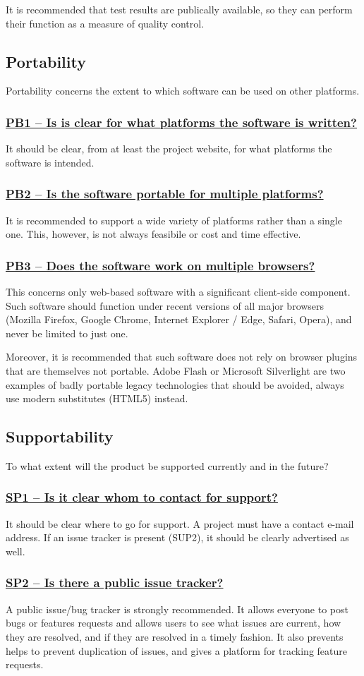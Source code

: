 \documentclass[a4paper,11pt]{article}
\newcommand{\criterion}[1]{\subsubsection*{\underline{#1}}}
\begin{document}
It is recommended that test results are publically available, so they can
perform their function as a measure of quality control.


\subsection{Portability}

Portability concerns the extent to which software can be used on other
platforms. 

\criterion{PB1 -- Is is clear for what platforms the software is written?}

It should be clear, from at least the project website, for what platforms the software
is intended.

\criterion{PB2 -- Is the software portable for multiple platforms?}

It is recommended to support a wide variety of platforms rather than a single
one. This, however, is not always feasibile or cost and time effective.

\criterion{PB3 -- Does the software work on multiple browsers?}

This concerns only web-based software with a significant client-side component.
Such software should function under recent versions of all major browsers
(Mozilla Firefox, Google Chrome, Internet Explorer / Edge, Safari, Opera), and
never be limited to just one.

Moreover, it is recommended that such software does not rely on browser plugins that
are themselves not portable. Adobe Flash or Microsoft Silverlight are two
examples of badly portable legacy technologies that should be avoided, always use
modern substitutes (HTML5) instead.

\subsection{Supportability}

To what extent will the product be supported currently and in the future?

\criterion{SP1 -- Is it clear whom to contact for support?}

It should be clear where to go for support. A project must have a contact
e-mail address. If an issue tracker is present (SUP2), it should be clearly advertised
as well.

\criterion{SP2 -- Is there a public issue tracker?}

A public issue/bug tracker is strongly recommended. It allows everyone to post
bugs or features requests and allows users to see what issues are current, how
they are resolved, and if they are resolved in a timely fashion. It also
prevents helps to prevent duplication of issues, and gives a platform for
tracking feature requests.
\end{document}
